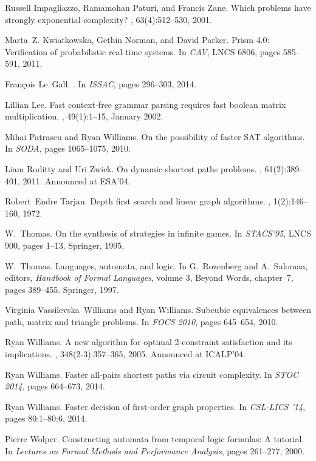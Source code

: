 \documentclass[11pt,letterpaper]{article}
\begin{document}
\begin{thebibliography}{10}
Russell Impagliazzo, Ramamohan Paturi, and Francis Zane.
\newblock Which problems have strongly exponential complexity?
, 63(4):512--530, 2001.

Marta~Z. Kwiatkowska, Gethin Norman, and David Parker.
\newblock Prism 4.0: Verification of probabilistic real-time systems.
\newblock In {\em CAV}, LNCS 6806, pages 585--591, 2011.

Fran\c{c}ois Le~Gall.
.
\newblock In {\em ISSAC}, pages 296--303, 2014.

Lillian Lee.
\newblock Fast context-free grammar parsing requires fast boolean matrix
  multiplication.
, 49(1):1--15, January 2002.

Mihai Patrascu and Ryan Williams.
\newblock On the possibility of faster {SAT} algorithms.
\newblock In {\em {SODA}}, pages 1065--1075, 2010.

Liam Roditty and Uri Zwick.
\newblock On dynamic shortest paths problems.
, 61(2):389--401, 2011.
\newblock Announced at ESA'04.

Robert~Endre Tarjan.
\newblock Depth first search and linear graph algorithms.
, 1(2):146--160, 1972.

W.~Thomas.
\newblock On the synthesis of strategies in infinite games.
\newblock In {\em STACS'95}, LNCS 900, pages 1--13. Springer, 1995.

W.~Thomas.
\newblock Languages, automata, and logic.
\newblock In G.~Rozenberg and A.~Salomaa, editors, {\em Handbook of Formal
  Languages}, volume 3, Beyond Words, chapter~7, pages 389--455. Springer,
  1997.

Virginia Vassilevska~Williams and Ryan Williams.
\newblock Subcubic equivalences between path, matrix and triangle problems.
\newblock In {\em {FOCS} 2010}, pages 645--654, 2010.

Ryan Williams.
\newblock A new algorithm for optimal 2-constraint satisfaction and its
  implications.
, 348(2-3):357--365, 2005.
\newblock Announced at ICALP'04.

Ryan Williams.
\newblock Faster all-pairs shortest paths via circuit complexity.
\newblock In {\em {STOC} 2014}, pages 664--673, 2014.

Ryan Williams.
\newblock Faster decision of first-order graph properties.
\newblock In {\em {CSL-LICS} '14}, pages 80:1--80:6, 2014.

Pierre Wolper.
\newblock Constructing automata from temporal logic formulas: {A} tutorial.
\newblock In {\em Lectures on Formal Methods and Performance Analysis}, pages
  261--277, 2000.

\end{thebibliography}
\end{document}
